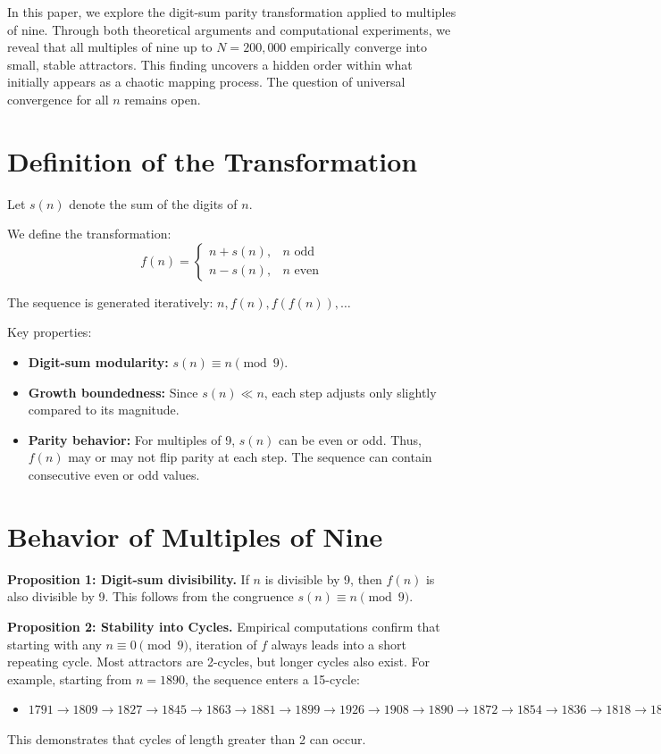 \documentclass[12pt]{article}
\begin{document}
In this paper, we explore the digit-sum parity transformation applied to multiples of nine. Through both theoretical arguments and computational experiments, we reveal that all multiples of nine up to $N=200,000$ empirically converge into small, stable attractors. This finding uncovers a hidden order within what initially appears as a chaotic mapping process. The question of universal convergence for all $n$ remains open.

\section{Definition of the Transformation}
Let $s(n)$ denote the sum of the digits of $n$.

We define the transformation:
\[
f(n) = \begin{cases} n + s(n), & n \text{ odd} \\ n - s(n), & n \text{ even} \end{cases}
\]

The sequence is generated iteratively: $n, f(n), f(f(n)), \ldots$

Key properties:
\begin{itemize}
    \item \textbf{Digit-sum modularity:} $s(n) \equiv n \pmod{9}$.
    \item \textbf{Growth boundedness:} Since $s(n) \ll n$, each step adjusts only slightly compared to its magnitude.
    \item \textbf{Parity behavior:} For multiples of 9, $s(n)$ can be even or odd. Thus, $f(n)$ may or may not flip parity at each step. The sequence can contain consecutive even or odd values.
\end{itemize}

\section{Behavior of Multiples of Nine}
\textbf{Proposition 1: Digit-sum divisibility.}
If $n$ is divisible by 9, then $f(n)$ is also divisible by 9. This follows from the congruence $s(n) \equiv n \pmod{9}$.

\textbf{Proposition 2: Stability into Cycles.}
Empirical computations confirm that starting with any $n \equiv 0 \pmod{9}$, iteration of $f$ always leads into a short repeating cycle. Most attractors are 2-cycles, but longer cycles also exist. For example, starting from $n=1890$, the sequence enters a 15-cycle:
\begin{itemize}
    \item $1791 \to 1809 \to 1827 \to 1845 \to 1863 \to 1881 \to 1899 \to 1926 \to 1908 \to 1890 \to 1872 \to 1854 \to 1836 \to 1818 \to 1800 \to 1791$
\end{itemize}
This demonstrates that cycles of length greater than 2 can occur.
\end{document}
